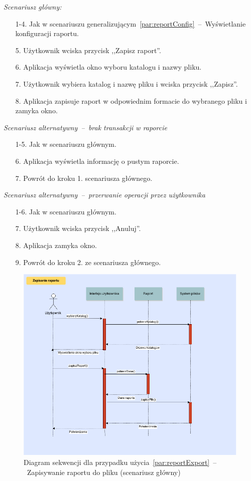 \noindent \noindent \textit{Scenariusz główny:}
\begin{enumerate}
  \item[1-4.] Jak w scenariuszu generalizującym~\ref{par:reportConfig}~--~Wyświetlanie konfiguracji raportu.
  \item[5.] Użytkownik wciska przycisk ,,Zapisz raport''.
  \item[6.] Aplikacja wyświetla okno wyboru katalogu i nazwy pliku.
  \item[7.] Użytkownik wybiera katalog i nazwę pliku i wciska przycisk ,,Zapisz''.
  \item[8.] Aplikacja zapisuje raport w odpowiednim formacie do wybranego pliku i zamyka okno.
\end{enumerate}

\noindent \textit{Scenariusz alternatywny~--~brak transakcji w raporcie}
\begin{enumerate}
  \item[1-5.] Jak w scenariuszu głównym.
  \item[6.] Aplikacja wyświetla informację o pustym raporcie.
  \item[7.] Powrót do kroku 1. scenariusza głównego.
\end{enumerate}

\noindent \textit{Scenariusz alternatywny~--~przerwanie operacji przez użytkownika}
\begin{enumerate}
  \item[1-6.] Jak w scenariuszu głównym.
  \item[7.] Użytkownik wciska przycisk ,,Anuluj''.
  \item[8.] Aplikacja zamyka okno.
  \item[9.] Powrót do kroku 2. ze scenariusza głównego.
\end{enumerate}

\begin{figure}[H]
  \includegraphics[width=\textwidth]{images/raport_export.png}
  \caption{Diagram sekwencji dla przypadku użycia~\ref{par:reportExport}~--~Zapisywanie raportu do pliku (scenariusz główny)}
\end{figure}

